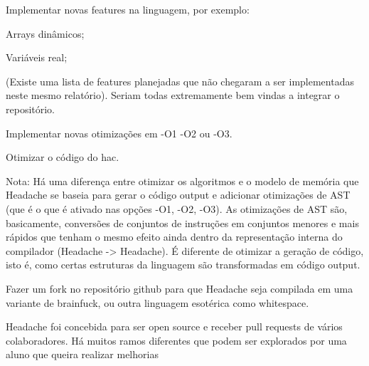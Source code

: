 Implementar novas features na linguagem, por exemplo: 

Arrays dinâmicos; 

Variáveis real; 

(Existe uma lista de features planejadas que não chegaram a ser implementadas neste mesmo relatório). Seriam todas extremamente bem vindas a integrar o repositório.

Implementar novas otimizações em -O1 -O2 ou -O3.

Otimizar o código do hac. 

Nota: Há uma diferença entre otimizar os algoritmos e o modelo de memória que Headache se baseia para gerar o código output e adicionar otimizações de AST (que é o que é ativado nas opções -O1, -O2, -O3). As otimizações de AST são, basicamente, conversões de conjuntos de instruções em conjuntos menores e mais rápidos que tenham o mesmo efeito ainda dentro da representação interna do compilador (Headache -> Headache). É diferente de otimizar a geração de código, isto é, como certas estruturas da linguagem são transformadas em código output.

Fazer um fork no repositório github para que Headache seja compilada em uma variante de brainfuck, ou outra linguagem esotérica como whitespace.

Headache foi concebida para ser open source e receber pull requests de vários colaboradores. Há muitos ramos diferentes que podem ser explorados por uma aluno que queira realizar melhorias

